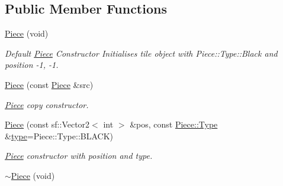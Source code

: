 \subsection*{Public Member Functions}
\begin{DoxyCompactItemize}
\item 
\hypertarget{class_piece_a64870ec3fe38b7f88c802d91db861abb}{\hyperlink{class_piece_a64870ec3fe38b7f88c802d91db861abb}{Piece} (void)}\label{class_piece_a64870ec3fe38b7f88c802d91db861abb}

\begin{DoxyCompactList}\small\item\em Default \hyperlink{class_piece}{Piece} Constructor Initialises tile object with Piece\-::\-Type\-::\-Black and position -\/1, -\/1. \end{DoxyCompactList}\item 
\hyperlink{class_piece_a97dfab7bb313f6e94eb23d4b8736bdac}{Piece} (const \hyperlink{class_piece}{Piece} \&src)
\begin{DoxyCompactList}\small\item\em \hyperlink{class_piece}{Piece} copy constructor. \end{DoxyCompactList}\item 
\hyperlink{class_piece_a0602222d442db964778b25d3e7b930cc}{Piece} (const sf\-::\-Vector2$<$ int $>$ \&pos, const \hyperlink{class_piece_abcd044975b3657962abfd2ded9194b09}{Piece\-::\-Type} \&\hyperlink{class_piece_ad41386c09d8ca34799398a2c11036cce}{type}=Piece\-::\-Type\-::\-B\-L\-A\-C\-K)
\begin{DoxyCompactList}\small\item\em \hyperlink{class_piece}{Piece} constructor with position and type. \end{DoxyCompactList}\item 
\hypertarget{class_piece_ad28316e726ffa96f258a79ea90e41d16}{\hyperlink{class_piece_ad28316e726ffa96f258a79ea90e41d16}{$\sim$\-Piece} (void)}\label{class_piece_ad28316e726ffa96f258a79ea90e41d16}


\end{DoxyCompactItemize}

